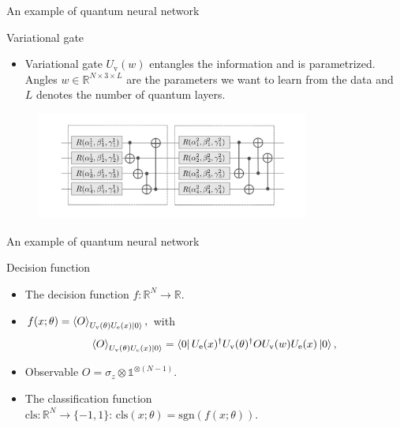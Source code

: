 \begingroup
\nologo
\begin{frame}{An example of quantum neural network}
\begin{block}{Variational gate}
\begin{itemize}
	\item Variational gate $U_{\mathrm{v}}(w)$ entangles the information 
	and is parametrized. 
	Angles $w \in \mathbb{R}^{N \times 3 \times L}$ 
	are the parameters we want to learn from the data 
	and $L$ denotes the number of quantum layers.
\end{itemize}
\end{block}
\begin{figure}
	\centering
	\includegraphics[width=0.8\textwidth]{pics/layer_sec.png}
\end{figure}
\end{frame}
\endgroup
\begin{frame}{An example of quantum neural network}
\begin{block}{Decision function}
\begin{itemize}
	\item The decision function $f: \mathbb{R}^N \to \mathbb{R}$.
	\item $f(x; \theta) = 
	\expval{O}_{U_{\mathrm{v}}(\theta) U_{\mathrm{e}}(x)\ket{0}},$
	with
	$$\expval{O}_{U_{\mathrm{v}}(\theta) U_{\mathrm{e}}(x)\ket{0}}=
	\bra{0}U_{\mathrm{e}}(x)^\dagger U_{\mathrm{v}}(\theta)^\dagger  
	O U_{\mathrm{v}}(w) U_{\mathrm{e}}(x)\ket{0},$$
	\item Observable $O= \sigma_z \otimes \mathbb{1}^{\otimes (N-1)} $.
	\item The classification function\\ $\mathrm{cls}: \mathbb{R}^N\to \{-1,1\}$:
	 $\mathrm{cls}(x; \theta) = \mathrm{sgn}(f(x; \theta))$.
\end{itemize}	
\end{block}
\end{frame}
